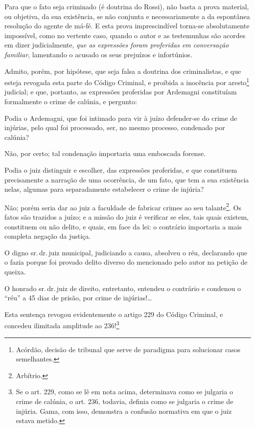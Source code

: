 Para que o fato seja criminado (é doutrina do Rossi), não basta a prova
material, ou objetiva, da sua existência, se não conjunta e
necessariamente a da espontânea resolução do agente de má-fé. E esta
prova imprescindível torna-se absolutamente impossível, como no vertente
caso, quando o autor e as testemunhas são acordes em dizer
judicialmente, \emph{que as expressões foram proferidas em conversação
familiar}, lamentando o acusado os seus prejuízos e infortúnios.

Admito, porém, por hipótese, que seja falsa a doutrina dos
criminalistas, e que esteja revogada esta parte do Código Criminal, e
proibida a inocência por aresto\footnote{ Acórdão, decisão de tribunal
  que serve de paradigma para solucionar casos semelhantes.} judicial; e
que, portanto, as expressões proferidas por Ardemagni constituíam
formalmente o crime de calúnia, e pergunto:

Podia o Ardemagni, que foi intimado para vir à juízo defender-se do
crime de injúrias, pelo qual foi processado, ser, no mesmo processo,
condenado por calúnia?

Não, por certo; tal condenação importaria uma emboscada forense.

Podia o juiz distinguir e escolher, das expressões proferidas, e que
constituem precisamente a narração de uma ocorrência, de um fato, que
tem a sua existência nelas, algumas para separadamente estabelecer o
crime de injúria?

Não; porém seria dar ao juiz a faculdade de fabricar crimes ao seu
talante\footnote{ Arbítrio.}. Os fatos são trazidos a juízo; e a missão
do juiz é verificar se eles, tais quais existem, constituem ou não
delito, e quais, em face da lei: o contrário importaria a mais completa
negação da justiça.

O digno sr.\,dr.\,juiz municipal, judiciando a causa, absolveu o réu,
declarando que o fazia porque foi provado delito diverso do mencionado
pelo autor na petição de queixa.

O honrado sr.\,dr.\,juiz de direito, entretanto, entendeu o contrário e
condenou o ``réu'' a 45 dias de prisão, por crime de injúrias!\ldots{}

Esta sentença revogou evidentemente o artigo 229 do Código Criminal, e
concedeu ilimitada amplitude ao 236!\footnote{ Se o art. 229, como se
  lê em nota acima, determinava como se julgaria o crime de calúnia, o
  art. 236, todavia, definia como se julgaria o crime de injúria. Gama,
  com isso, demonstra a confusão normativa em que o juiz estava metido.}

